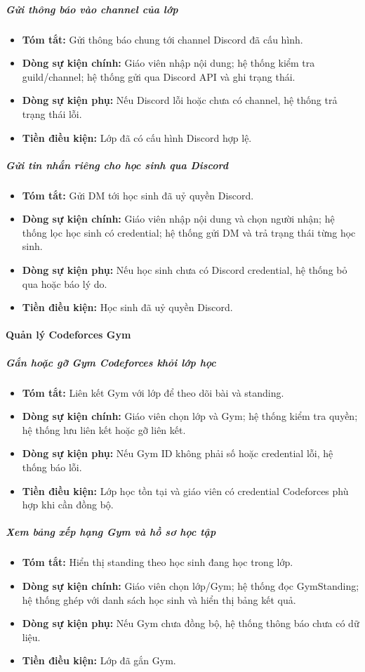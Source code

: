\documentclass[12pt,a4paper]{article}
\begin{document}
\subparagraph{Gửi thông báo vào channel của lớp}
\begin{itemize}[leftmargin=*]
\item \textbf{Tóm tắt:} Gửi thông báo chung tới channel Discord đã cấu hình.
\item \textbf{Dòng sự kiện chính:} Giáo viên nhập nội dung; hệ thống kiểm tra guild/channel; hệ thống gửi qua Discord API và ghi trạng thái.
\item \textbf{Dòng sự kiện phụ:} Nếu Discord lỗi hoặc chưa có channel, hệ thống trả trạng thái lỗi.
\item \textbf{Tiền điều kiện:} Lớp đã có cấu hình Discord hợp lệ.
\end{itemize}

\subparagraph{Gửi tin nhắn riêng cho học sinh qua Discord}
\begin{itemize}[leftmargin=*]
\item \textbf{Tóm tắt:} Gửi DM tới học sinh đã uỷ quyền Discord.
\item \textbf{Dòng sự kiện chính:} Giáo viên nhập nội dung và chọn người nhận; hệ thống lọc học sinh có credential; hệ thống gửi DM và trả trạng thái từng học sinh.
\item \textbf{Dòng sự kiện phụ:} Nếu học sinh chưa có Discord credential, hệ thống bỏ qua hoặc báo lý do.
\item \textbf{Tiền điều kiện:} Học sinh đã uỷ quyền Discord.
\end{itemize}

\paragraph{Quản lý Codeforces Gym}

\subparagraph{Gắn hoặc gỡ Gym Codeforces khỏi lớp học}
\begin{itemize}[leftmargin=*]
\item \textbf{Tóm tắt:} Liên kết Gym với lớp để theo dõi bài và standing.
\item \textbf{Dòng sự kiện chính:} Giáo viên chọn lớp và Gym; hệ thống kiểm tra quyền; hệ thống lưu liên kết hoặc gỡ liên kết.
\item \textbf{Dòng sự kiện phụ:} Nếu Gym ID không phải số hoặc credential lỗi, hệ thống báo lỗi.
\item \textbf{Tiền điều kiện:} Lớp học tồn tại và giáo viên có credential Codeforces phù hợp khi cần đồng bộ.
\end{itemize}

\subparagraph{Xem bảng xếp hạng Gym và hồ sơ học tập}
\begin{itemize}[leftmargin=*]
\item \textbf{Tóm tắt:} Hiển thị standing theo học sinh đang học trong lớp.
\item \textbf{Dòng sự kiện chính:} Giáo viên chọn lớp/Gym; hệ thống đọc GymStanding; hệ thống ghép với danh sách học sinh và hiển thị bảng kết quả.
\item \textbf{Dòng sự kiện phụ:} Nếu Gym chưa đồng bộ, hệ thống thông báo chưa có dữ liệu.
\item \textbf{Tiền điều kiện:} Lớp đã gắn Gym.
\end{itemize}
\end{document}
